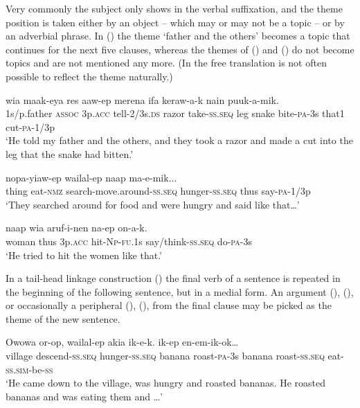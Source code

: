 Very commonly the subject only shows in the verbal suffixation, and the theme position is taken either by an object -- which may or may not be a topic -- or by an adverbial phrase. In () the theme  `father and the others' becomes a topic that continues for the next five clauses, whereas the themes of () and () do not become topics and are not mentioned any more. (In the free translation is not often possible to reflect the theme naturally.)

\ea%
\label{ex:x1909}
\gll {}    wia  maak-eya  res  aaw-ep  merena  ifa  keraw-a-k  nain  puuk-a-mik. \\
1s/p.father  \textsc{assoc}  3p.\textsc{acc}  tell-2/3s.\textsc{ds}  razor  take-\textsc{ss}.\textsc{seq} leg  snake  bite-\textsc{pa}-3s  that1  cut-\textsc{pa}-1/3p     \\
\glt`He told my father and the others, and they took  a razor and made a cut into the leg that the snake had bitten.'
\z


\ea%
\label{ex:x1910}
\gll {}    nopa-yiaw-ep  wailal-ep  naap  ma-e-mik...\\
thing  eat-\textsc{nmz}  search-move.around-\textsc{ss}.\textsc{seq}  hunger-\textsc{ss}.\textsc{seq} thus  say-\textsc{pa}-1/3p      \\
\glt`They searched around for food and were hungry and said like that{\dots}'
\z


\ea%
\label{ex:x1911}
\gll {}  naap  wia  aruf-i-nen  na-ep  on-a-k. \\
woman  thus  3p.\textsc{acc}  hit-\textsc{Np}-\textsc{fu}.1s  say/think-\textsc{ss}.\textsc{seq} do-\textsc{pa}-3s      \\
\glt`He tried to hit the women like that.'
\z


In a tail-head linkage construction () the final verb of a sentence is repeated in the beginning of the following sentence, but in a medial form. An argument (), (), or occasionally a peripheral (), (), from the final clause may be picked as the theme of the new sentence.

\ea%
\label{ex:x1912}
\gll Owowa  or-op,  wailal-ep  akia  ik-e-k.   ik-ep  en-em-ik-ok{\dots} \\
village  descend-\textsc{ss}.\textsc{seq}  hunger-\textsc{ss}.\textsc{seq}  banana  roast-\textsc{pa}-3s banana  roast-\textsc{ss}.\textsc{seq}  eat-\textsc{ss}.\textsc{sim}-be-\textsc{ss}     \\
\glt`He came down to the village, was hungry and roasted bananas. He roasted bananas and was eating them and {\dots}'
\z



